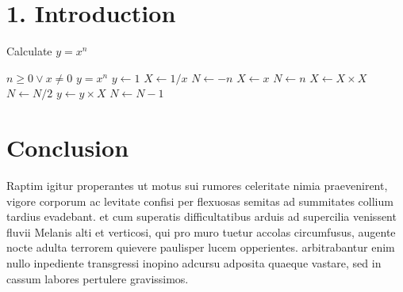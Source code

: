 \documentclass[a4paper,12pt]{report}	%
\renewcommand{\and}{\textbf{et}}
\begin{document}

	\umonsCoverPage		%
	
	
	\begin{abstract}	%
		...
	\end{abstract}
	
	\clearpage			%
	\tableofcontents
	


	\clearpage			%
	
	{\section*{1. Introduction}}
	
	\begin{algorithm}
	\caption{Calculate $y = x^n$}
	\label{Modele pour un algo}
	\begin{algorithmic} [1]
	\REQUIRE $n \geq 0 \vee x \neq 0$
	\ENSURE $y = x^n$
	\STATE $y \gets 1$
	\STATE $X \leftarrow 1 / x$
	\STATE $N \leftarrow -n$
	\ELSE
	\STATE $X \leftarrow x$
	\STATE $N \leftarrow n$
	\ENDIF
	\WHILE{$N \neq 0$ \and $N \neq 0$}
	\STATE $X \leftarrow X \times X$
	\STATE $N \leftarrow N / 2$
	\ELSE[$N$ is odd]
	\STATE $y \leftarrow y \times X$
	\STATE $N \leftarrow N - 1$
	\ENDIF
	\ENDWHILE
	\end{algorithmic}
	\end{algorithm}
			
	{\section*{Conclusion}}
	
\noindent Raptim igitur properantes ut motus sui rumores celeritate nimia praevenirent, vigore corporum ac levitate confisi per flexuosas semitas ad summitates collium tardius evadebant. et cum superatis difficultatibus arduis ad supercilia venissent fluvii Melanis alti et verticosi, qui pro muro tuetur accolas circumfusus, augente nocte adulta terrorem quievere paulisper lucem opperientes. arbitrabantur enim nullo inpediente transgressi inopino adcursu adposita quaeque vastare, sed in cassum labores pertulere gravissimos.
	
\end{document}
